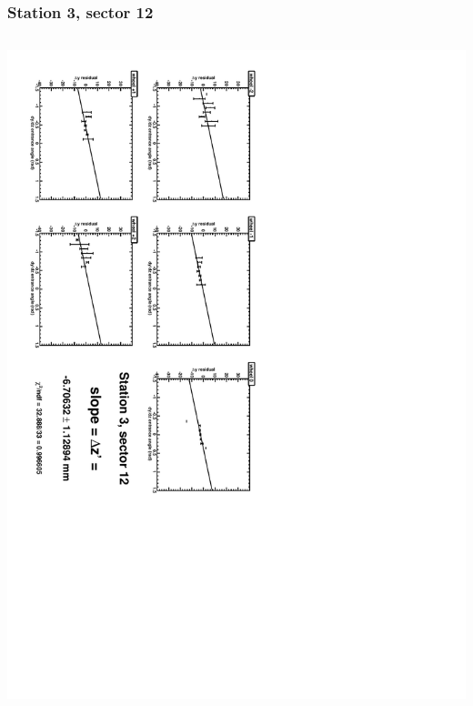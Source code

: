 \documentclass[compress]{beamer}
\begin{document}
\begin{frame}
\frametitle{Station 3, sector 12}
\begin{columns}
\includegraphics[height=\linewidth, angle=90]{zfits/zfit_3_12.pdf}


\end{columns}
\end{frame}
\end{document}
